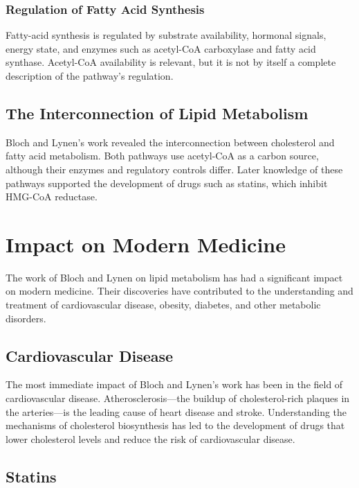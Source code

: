 \subsubsection{Regulation of Fatty Acid Synthesis}

Fatty-acid synthesis is regulated by substrate availability, hormonal signals, energy state, and enzymes such as acetyl-CoA carboxylase and fatty acid synthase. Acetyl-CoA availability is relevant, but it is not by itself a complete description of the pathway's regulation.

\subsection{The Interconnection of Lipid Metabolism}

Bloch and Lynen's work revealed the interconnection between cholesterol and fatty acid metabolism. Both pathways use acetyl-CoA as a carbon source, although their enzymes and regulatory controls differ. Later knowledge of these pathways supported the development of drugs such as statins, which inhibit HMG-CoA reductase.

\section{Impact on Modern Medicine}

The work of Bloch and Lynen on lipid metabolism has had a significant impact on modern medicine. Their discoveries have contributed to the understanding and treatment of cardiovascular disease, obesity, diabetes, and other metabolic disorders.

\subsection{Cardiovascular Disease}

The most immediate impact of Bloch and Lynen's work has been in the field of cardiovascular disease. Atherosclerosis---the buildup of cholesterol-rich plaques in the arteries---is the leading cause of heart disease and stroke. Understanding the mechanisms of cholesterol biosynthesis has led to the development of drugs that lower cholesterol levels and reduce the risk of cardiovascular disease.

\subsection{Statins}

